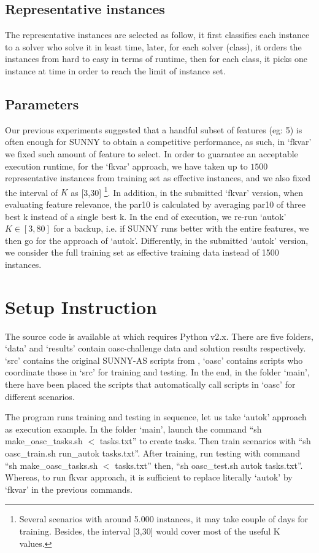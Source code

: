\documentclass[tablecaption=bottom,wcp]{jmlr} %
\begin{document}
\subsection{Representative instances}
The representative instances are selected as follow, it first classifies each instance to a solver who solve it in least time, later, for each solver (class), it orders the instances from hard to easy in terms of runtime, then for each class, it picks one instance at time in order to reach the limit of instance set. 

\subsection{Parameters}
Our previous experiments \cite{DBLP:conf/ictai/2015} suggested that a handful subset of features (eg: 5) is often enough for SUNNY to obtain a competitive performance, as such, in `fkvar' we fixed such amount of feature to select. In order to guarantee an acceptable execution runtime, for the `fkvar' approach, we have taken up to $1500$ representative instances from training set as effective instances, and we also fixed the interval of $K$ as [3,30] \footnote{Several scenarios with around 5.000 instances, it may take couple of days for training. Besides, the interval [3,30] would cover most of the useful K values. }. In addition, in the submitted `fkvar' version, when evaluating feature relevance, the par10 is calculated by averaging par10 of three best k instead of a single best k. In the end of execution, we re-run `autok' $K \in [3,80]$ for a backup, i.e. if SUNNY runs better with the entire features, we then go for the approach of `autok'. Differently, in the submitted `autok' version, we consider the full training set as effective training data instead of 1500 instances. 

\section{Setup Instruction}

The source code is available at \cite{sunnyoasc} which requires Python v2.x. There are five folders, `data' and `results' contain oasc-challenge data and solution results respectively. `src' contains the original SUNNY-AS scripts from \cite{sunnyas}, `oasc' contains scripts who coordinate those in `src' for training and testing. In the end, in the folder `main', there have been placed the scripts that automatically call scripts in `oasc' for different scenarios. 

The program runs training and testing in sequence, let us take `autok' approach as execution example. In the folder `main', launch the command ``sh make\_oasc\_tasks.sh $<$ tasks.txt'' to create tasks. Then train scenarios with ``sh oasc\_train.sh run\_autok tasks.txt''. After training, run testing with command ``sh make\_oasc\_tasks.sh $<$ tasks.txt'' then, ``sh oasc\_test.sh autok tasks.txt''. Whereas, to run fkvar approach, it is sufficient to replace literally `autok' by `fkvar' in the previous commands. 



\appendix
\end{document}
